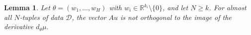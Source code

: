 \documentclass[twoside]{article}
\newtheorem{lemma}[theorem]{Lemma}
\theoremstyle{definition}
\theoremstyle{remark}
\begin{document}
\begin{lemma}
\label{lem:technical}
    Let $\theta = (w_1, \ldots, w_H)$ with $w_i \in \mathbb{R}^{k_i} \setminus \{ 0 \}$, and let $N \geq k$.
    For almost all $N$-tuples of data $\mathcal{D}$, the vector $Au$ is not orthogonal to the image of the derivative $d_\theta \mu$.
\end{lemma}
    
\end{document}
